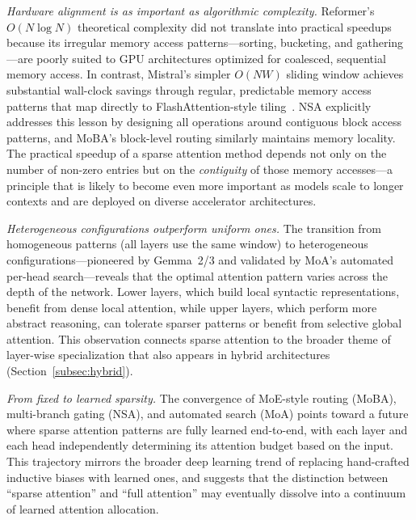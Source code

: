 \emph{Hardware alignment is as important as algorithmic complexity.} Reformer's $O(N \log N)$ theoretical complexity did not translate into practical speedups because its irregular memory access patterns---sorting, bucketing, and gathering---are poorly suited to GPU architectures optimized for coalesced, sequential memory access. In contrast, Mistral's simpler $O(NW)$ sliding window achieves substantial wall-clock savings through regular, predictable memory access patterns that map directly to FlashAttention-style tiling~\cite{dao2022flashattention}. NSA explicitly addresses this lesson by designing all operations around contiguous block access patterns, and MoBA's block-level routing similarly maintains memory locality. The practical speedup of a sparse attention method depends not only on the number of non-zero entries but on the \emph{contiguity} of those memory accesses---a principle that is likely to become even more important as models scale to longer contexts and are deployed on diverse accelerator architectures.

\emph{Heterogeneous configurations outperform uniform ones.} The transition from homogeneous patterns (all layers use the same window) to heterogeneous configurations---pioneered by Gemma~2/3 and validated by MoA's automated per-head search---reveals that the optimal attention pattern varies across the depth of the network. Lower layers, which build local syntactic representations, benefit from dense local attention, while upper layers, which perform more abstract reasoning, can tolerate sparser patterns or benefit from selective global attention. This observation connects sparse attention to the broader theme of layer-wise specialization that also appears in hybrid architectures (Section~\ref{subsec:hybrid}).

\emph{From fixed to learned sparsity.} The convergence of MoE-style routing (MoBA), multi-branch gating (NSA), and automated search (MoA) points toward a future where sparse attention patterns are fully learned end-to-end, with each layer and each head independently determining its attention budget based on the input. This trajectory mirrors the broader deep learning trend of replacing hand-crafted inductive biases with learned ones, and suggests that the distinction between ``sparse attention'' and ``full attention'' may eventually dissolve into a continuum of learned attention allocation.

